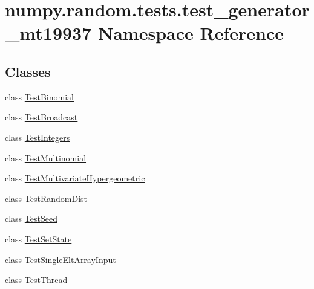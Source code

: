 \hypertarget{namespacenumpy_1_1random_1_1tests_1_1test__generator__mt19937}{}\section{numpy.\+random.\+tests.\+test\+\_\+generator\+\_\+mt19937 Namespace Reference}
\label{namespacenumpy_1_1random_1_1tests_1_1test__generator__mt19937}
\subsection*{Classes}
\begin{DoxyCompactItemize}
\item 
class \hyperlink{classnumpy_1_1random_1_1tests_1_1test__generator__mt19937_1_1TestBinomial}{Test\+Binomial}
\item 
class \hyperlink{classnumpy_1_1random_1_1tests_1_1test__generator__mt19937_1_1TestBroadcast}{Test\+Broadcast}
\item 
class \hyperlink{classnumpy_1_1random_1_1tests_1_1test__generator__mt19937_1_1TestIntegers}{Test\+Integers}
\item 
class \hyperlink{classnumpy_1_1random_1_1tests_1_1test__generator__mt19937_1_1TestMultinomial}{Test\+Multinomial}
\item 
class \hyperlink{classnumpy_1_1random_1_1tests_1_1test__generator__mt19937_1_1TestMultivariateHypergeometric}{Test\+Multivariate\+Hypergeometric}
\item 
class \hyperlink{classnumpy_1_1random_1_1tests_1_1test__generator__mt19937_1_1TestRandomDist}{Test\+Random\+Dist}
\item 
class \hyperlink{classnumpy_1_1random_1_1tests_1_1test__generator__mt19937_1_1TestSeed}{Test\+Seed}
\item 
class \hyperlink{classnumpy_1_1random_1_1tests_1_1test__generator__mt19937_1_1TestSetState}{Test\+Set\+State}
\item 
class \hyperlink{classnumpy_1_1random_1_1tests_1_1test__generator__mt19937_1_1TestSingleEltArrayInput}{Test\+Single\+Elt\+Array\+Input}
\item 
class \hyperlink{classnumpy_1_1random_1_1tests_1_1test__generator__mt19937_1_1TestThread}{Test\+Thread}
\end{DoxyCompactItemize}
